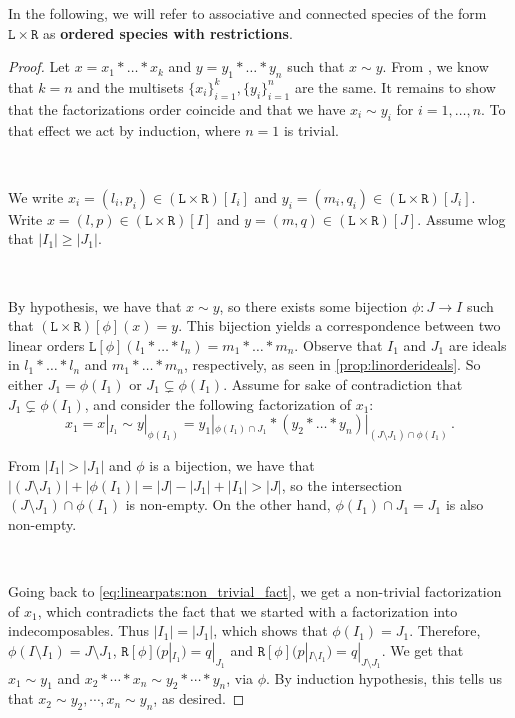 \documentclass[12pt, reqno]{amsart}
\theoremstyle{definition}
\begin{document}
In the following, we will refer to associative and connected species of the form $\mathtt{L} \times \mathtt{R}$ as \textbf{ordered species with restrictions}.

\begin{proof}
Let $x = x_1 \ast \dots \ast x_k $ and $ y =  y_1 \ast \dots \ast y_n$ such that $x \sim y$.
From \cite[Corollary 3.4.]{Penaguiao2020}, we know that $k = n$ and the multisets $\{x_i\}_{i=1}^k,  \{y_i\}_{i=1}^n$ are the same.
It remains to show that the factorizations order coincide and that we have $x_i \sim y_i$ for $i = 1, \dots , n$.
To that effect we act by induction, where $n = 1$ is trivial.

\

We write $x_i = (l_i, p_i)\in (\mathtt{L}\times \mathtt{R})[I_i]$ and $y_i = (m_i, q_i)\in (\mathtt{L}\times \mathtt{R})[J_i]$.
Write $x = (l, p) \in (\mathtt{L}\times \mathtt{R})[I] $ and $y = (m, q) \in (\mathtt{L}\times \mathtt{R})[J]$.
Assume wlog that $|I_1 | \geq |J_1|$.

\

By hypothesis, we have that $x \sim y$, so there exists some bijection $\phi: J \to I$ such that $ (\mathtt{L}\times \mathtt{R})[\phi](x) = y$.
This bijection yields a correspondence between two linear orders $\mathtt{L} [\phi] (l_1 \ast \dots \ast l_n) = m_1\ast \dots \ast m_n $.
Observe that $I_1$ and $J_1$ are ideals in $l_1 \ast \dots \ast l_n$ and $m_1 \ast \dots \ast m_n$, respectively, as seen in \cref{prop:linorderideals}.
So either $J_1 = \phi (I_1)$ or $J_1 \subsetneq  \phi(I_1) $.
Assume for sake of contradiction that $J_1 \subsetneq  \phi(I_1)$, and consider the following factorization of $x_1 $:
\begin{equation}\label{eq:linearpats:non_trivial_fact}
x_1 = x|_{I_1} \sim y|_{\phi(I_1)} = y_1|_{\phi(I_1) \cap J_1} \ast (y_2 \ast \dots \ast y_n)|_{(J\setminus J_1) \cap \phi(I_1)}\, . 
\end{equation}

From $|I_1| > |J_1|$ and $\phi $ is a bijection, we have that $| (J\setminus J_1) | + | \phi(I_1) | = |J| - |J_1| + |I_1| > |J|$, so the intersection $(J\setminus J_1) \cap \phi(I_1)$ is non-empty.
On the other hand, $\phi(I_1) \cap J_1 = J_1$ is also non-empty.

\

Going back to \eqref{eq:linearpats:non_trivial_fact}, we get a non-trivial factorization of $x_1$, which contradicts the fact that we started with a factorization into indecomposables. Thus $|I_1 | = |J_1|$, which shows that $\phi(I_1) = J_1$.
Therefore,  $\phi(I\setminus I_1) = J \setminus  J_1$, $ \mathtt{R}[\phi] (p|_{I_1}) = q|_{J_1} $ and $ \mathtt{R}[\phi] (p|_{I \setminus I_1}) = q|_{J \setminus J_1} $.
We get that $x_1 \sim y_1$ and $x_2 \ast \cdots \ast x_n \sim y_2 \ast \cdots \ast y_n$, via $\phi$.
By induction hypothesis, this tells us that $x_2 \sim y_2, \cdots , x_n \sim y_n$, as desired.
\end{proof}
\end{document}
